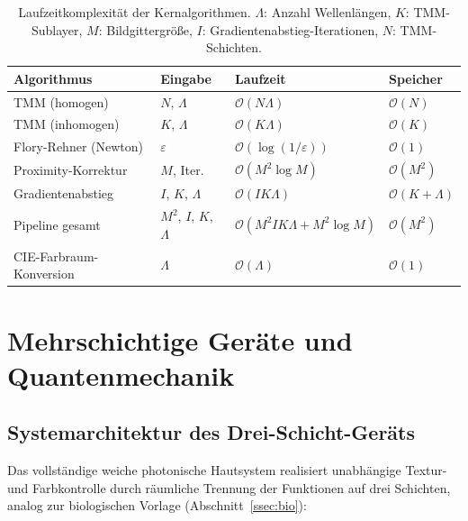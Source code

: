 ﻿\documentclass[a4paper,12pt]{article}
\theoremstyle{definition}
\newcommand{\ordre}[1]{\mathcal{O}\!\left(#1\right)}
\begin{document}
	\begin{table}[htb]
		\centering
		\caption{Laufzeitkomplexität der Kernalgorithmen.
			$\Lambda$: Anzahl Wellenlängen, $K$: TMM-Sublayer, $M$: Bildgittergröße,
			$I$: Gradientenabstieg-Iterationen, $N$: TMM-Schichten.}
		\label{tab:komplexitaet}
		\begin{tabular}{llll}
			\toprule
			\textbf{Algorithmus} & \textbf{Eingabe} & \textbf{Laufzeit} & \textbf{Speicher}\\
			\midrule
			TMM (homogen) & $N$, $\Lambda$ & $\ordre{N\Lambda}$ & $\ordre{N}$\\
			TMM (inhomogen) & $K$, $\Lambda$ & $\ordre{K\Lambda}$ & $\ordre{K}$\\
			Flory-Rehner (Newton) & $\varepsilon$ & $\ordre{\log(1/\varepsilon)}$ & $\ordre{1}$\\
			Proximity-Korrektur & $M$, Iter. & $\ordre{M^2\log M}$ & $\ordre{M^2}$\\
			Gradientenabstieg & $I$, $K$, $\Lambda$ & $\ordre{I K\Lambda}$ & $\ordre{K+\Lambda}$\\
			Pipeline gesamt & $M^2$, $I$, $K$, $\Lambda$ & $\ordre{M^2 I K\Lambda + M^2\log M}$ & $\ordre{M^2}$\\
			CIE-Farbraum-Konversion & $\Lambda$ & $\ordre{\Lambda}$ & $\ordre{1}$\\
			\bottomrule
		\end{tabular}
	\end{table}
	
	\section{Mehrschichtige Geräte und Quantenmechanik}
	\label{sec:mehrschicht}
	
	\subsection{Systemarchitektur des Drei-Schicht-Geräts}
	
	Das vollständige weiche photonische Hautsystem realisiert unabhängige
	Textur- und Farbkontrolle durch räumliche Trennung der Funktionen auf
	drei Schichten, analog zur biologischen Vorlage (Abschnitt~\ref{ssec:bio}):
	
\end{document}
